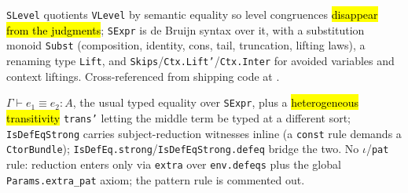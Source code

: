 \begin{definition}
\label{family:expb-sexpr-syntax}
\leanok
{}

 \texttt{SLevel} quotients \texttt{VLevel} by semantic equality so level congruences
\hl{disappear from the judgments}; \texttt{SExpr} is de Bruijn syntax over it, with a substitution
monoid \texttt{Subst} (composition, identity, cons, tail, truncation, lifting laws), a renaming type
\texttt{Lift}, and \texttt{Skips}/\texttt{Ctx.Lift'}/\texttt{Ctx.Inter} for avoided variables and
context liftings.
 Cross-referenced from shipping code at .
\end{definition}

\begin{definition}
\label{inductive:expb-sexpr-isdefeq}
\leanok
{}

 $\Gamma\vdash e_1\equiv e_2:A$, the usual typed equality over \texttt{SExpr}, plus a
\hl{heterogeneous transitivity} \texttt{trans'} letting the middle term be typed at a different
sort; \texttt{IsDefEqStrong} carries subject-reduction witnesses inline (a \texttt{const} rule
demands a \texttt{CtorBundle}); \texttt{IsDefEq.strong}/\texttt{IsDefEqStrong.defeq} bridge the two.
 No $\iota$/\texttt{pat} rule: reduction enters only via \texttt{extra} over
\texttt{env.defeqs} plus the global \texttt{Params.extra\_pat} axiom; the pattern rule is commented
out.
\end{definition}

